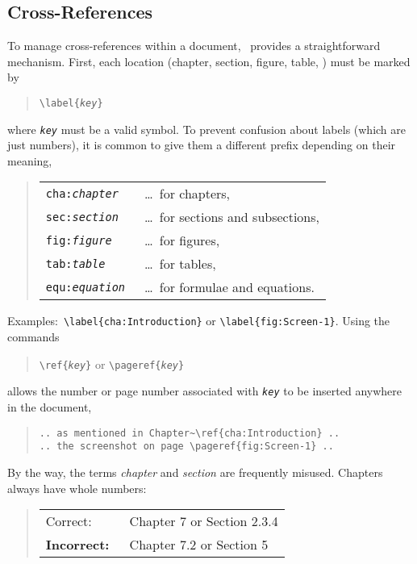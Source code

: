 \subsection{Cross-References}
\label{sec:cross-references}

To manage cross-references within a document, \latex\ provides a straightforward
mechanism. First, each location (chapter, section, figure, table, \etc) must be
marked by
%
\begin{quote}
    \verb!\label{!\texttt{\em key}\verb!}!
\end{quote}
%
where \texttt{\em key} must be a valid \latex symbol.
To prevent confusion about labels (which are just numbers), it is common to give
them a different prefix depending on their meaning, \eg
%
\begin{quote}
    \begin{tabular}{ll}
        \verb!cha:!\texttt{\em chapter} & \ \ldots\ for chapters, \\
        \verb!sec:!\texttt{\em section} & \ \ldots\ for sections and
        subsections, \\
        \verb!fig:!\texttt{\em figure} & \ \ldots\ for figures, \\
        \verb!tab:!\texttt{\em table} & \ \ldots\ for tables, \\
        \verb!equ:!\texttt{\em equation} & \ \ldots\ for formulae and equations.
    \end{tabular}
\end{quote}
%
\noindent
Examples:\ \verb!\label{cha:Introduction}! or \verb!\label{fig:Screen-1}!.
Using the commands
%
\begin{quote}
    \verb!\ref{!\texttt{\emph{key}}\verb!}!
    \hspace{1em} or \hspace{1em}
    \verb!\pageref{!\texttt{\emph{key}}\verb!}!
\end{quote}
%
allows the number or page number associated with \texttt{\emph{key}} to be
inserted anywhere in the document, \eg
%
\begin{quote}
    \verb!.. as mentioned in Chapter~\ref{cha:Introduction} ..!\\
    \verb!.. the screenshot on page \pageref{fig:Screen-1} ..!
\end{quote}
%
By the way, the terms \emph{chapter} and \emph{section} are frequently misused.
Chapters always have whole numbers:
%
\begin{quote}
    \begin{tabular}{ll}
        \textrm{Correct:\ } & Chapter 7 or Section 2.3.4 \\
        \textbf{Incorrect:\ }  & Chapter 7.2 or Section 5
    \end{tabular}
\end{quote}

